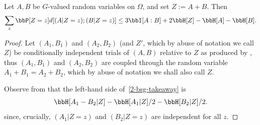 \begin{lemma}\label{entropic-bsg}
  \leanok
  Let $A,B$ be $G$-valued random variables on $\Omega$, and set $Z := A+B$.
Then
\begin{equation}\label{2-bsg-takeaway} \sum_{z}  \bbP[Z=z] d[(A | Z = z); (B | Z = z)] \leq 3  \bbI[A:B] + 2 \bbH[Z] - \bbH[A] - \bbH[B]. \end{equation}
\end{lemma}

\begin{proof}
  \leanok
Let $(A_1, B_1)$ and $(A_2, B_2)$ (and $Z'$, which by abuse of notation we call $Z$) be conditionally independent trials of $(A,B)$ relative to $Z$ as produced by , thus $(A_1,B_1)$ and $(A_2,B_2)$ are coupled through the random variable $A_1 + B_1 = A_2 + B_2$, which by abuse of notation we shall also call $Z$.

Observe from  that the left-hand side of~\eqref{2-bsg-takeaway} is
\begin{equation}\label{lhs-to-bound}
\bbH[A_1 - B_2| Z] - \bbH[A_1 | Z]/2 - \bbH[B_2 | Z]/2.
\end{equation}
since, crucially, $(A_1 | Z=z)$ and $(B_2 | Z=z)$ are independent for all $z$.


\end{proof}
